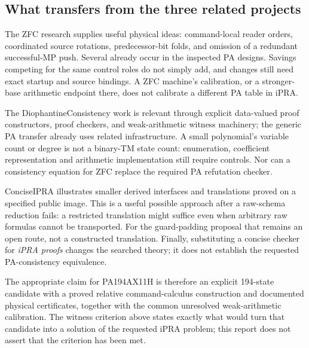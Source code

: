 \subsection{What transfers from the three related projects}
\label{ipra-related}

The ZFC research supplies useful physical ideas: command-local reader
orders, coordinated source rotations, predecessor-bit folds, and omission
of a redundant successful-MP push.  Several already occur in the inspected
PA designs.  Savings competing for the same control roles do not simply
add, and changes still need exact startup and source bindings.  A ZFC
machine's calibration, or a stronger-base arithmetic endpoint there, does
not calibrate a different PA table in iPRA.\cite{zfc}

The DiophantineConsistency work is relevant through explicit data-valued
proof constructors, proof checkers, and weak-arithmetic witness machinery;
the generic PA transfer already uses related infrastructure.  A small
polynomial's variable count or degree is not a binary-TM state count:
enumeration, coefficient representation and arithmetic implementation
still require controls.  Nor can a consistency equation for ZFC replace
the required PA refutation checker.\cite{dio}

ConciseIPRA illustrates smaller derived interfaces and translations proved
on a specified public image.  This is a useful possible approach after a
raw-schema reduction fails: a restricted translation might suffice even
when arbitrary raw formulas cannot be transported.  For the guard-padding
proposal that remains an open route, not a constructed translation.
Finally, substituting a concise checker for \emph{iPRA proofs} changes the
searched theory; it does not establish the requested PA-consistency
equivalence.\cite{concise}

The appropriate claim for PA194AX11H is therefore an explicit 194-state
candidate with a proved relative command-calculus construction and
documented physical certificates, together with the common unresolved
weak-arithmetic calibration.  The witness criterion above states exactly
what would turn that candidate into a solution of the requested iPRA
problem; this report does not assert that the criterion has been met.
